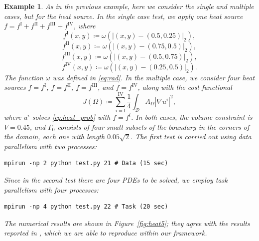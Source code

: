\documentclass[iicol,pdflatex,sn-mathphys-ay]{sn-jnl}%
\theoremstyle{thmstyleone}%
\theoremstyle{thmstyletwo}%
\newtheorem{example}{Example}%
\theoremstyle{thmstylethree}%
\begin{document}
\begin{example}\label{ex:heat5}
As in the previous example, here we consider the single and multiple cases,
but for the heat source.
In the single case test, we apply one heat source 
$f = f^\mathrm{I} + f^\mathrm{II} + f^\mathrm{III} + f^\mathrm{IV}$,
where
\[
	f^\mathrm{I}(x,y) \coloneqq \omega(\vert(x,y)-(0.5, 0.25)\vert_2),
\]
\[
	f^\mathrm{II}(x,y) \coloneqq \omega(\vert(x,y)-(0.75, 0.5)\vert_2),
\]
\[
	f^\mathrm{III}(x,y) \coloneqq \omega(\vert(x,y)-(0.5, 0.75)\vert_2),
\]
\[
	f^\mathrm{IV}(x,y) \coloneqq \omega(\vert(x,y)-(0.25, 0.5)\vert_2).
\]
The function $\omega$ was defined in \eqref{eq:rad}.
In the multiple case, we consider four heat sources 
$f=f^\mathrm{I}$, $f=f^\mathrm{II}$, $f=f^\mathrm{III}$, and $f=f^\mathrm{IV}$,
along with the cost functional
\[
	J(\Omega) \coloneqq \sum_{i=\mathrm{I}}^{\mathrm{IV}}\frac{1}{4}
	\int_{\mathcal{D}} A_{\Omega}\left|\nabla u^i\right|^{2},
\]
where $u^i$ solves \eqref{eq:heat_prob} with $f = f^i$.
In both cases, the volume constraint is $V = 0.45$, and 
$\Gamma_0$ consists of four small subsets
of the boundary in the corners of the domain, each one with length $0.05\sqrt{2}$.
The first test is carried out using data parallelism with two processes:
\begin{lstlisting}
mpirun -np 2 python test.py 21 # Data (15 sec)
\end{lstlisting}
Since in the second test there are four PDEs to be solved,
we employ task parallelism with four processes:
\begin{lstlisting}
mpirun -np 4 python test.py 22 # Task (20 sec)
\end{lstlisting}
The numerical results are shown in Figure~\ref{fig:heat5};
they agree with the results reported in \cite{MR2278190},
which we are able to reproduce within our framework.
\end{example}
\end{document}
